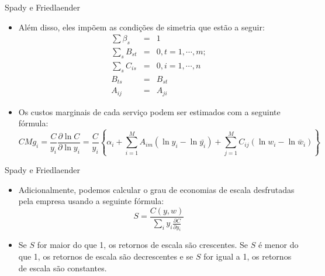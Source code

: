 \documentclass{beamer}
\begin{document}
\begin{frame}{Spady e Friedlaender}

\begin{itemize}
\item Além disso, eles impõem as condições de simetria que estão a seguir:
\begin{eqnarray*}
\sum\beta_{s} & = & 1\\
\sum_{s}B_{st} & = & 0,t=1,\cdots,m;\\
\sum_{s}C_{is} & = & 0,i=1,\cdots,n\\
B_{ts} & = & B_{st}\\
A_{ij} & = & A_{ji}
\end{eqnarray*}
\item Os custos marginais de cada serviço podem ser estimados com a seguinte
fórmula:{\scriptsize{}
\[
CMg_{i}=\frac{C}{y_{i}}\frac{\partial\ln C}{\partial\ln y_{i}}=\frac{C}{y_{i}}\left\{ \alpha_{i}+\sum_{i=1}^{M}A_{im}(\ln y_{i}-\ln\bar{y_{i}})+\sum_{j=1}^{M}C_{ij}(\ln w_{i}-\ln\bar{w}_{i})\right\} 
\]
}{\scriptsize \par}
\end{itemize}
\end{frame}

\begin{frame}{Spady e Friedlaender}

\begin{itemize}
\item Adicionalmente, podemos calcular o grau de economias de escala desfrutadas
pela empresa usando a seguinte fórmula:
\[
S=\frac{C(y,w)}{\sum_{i}y_{i}\frac{\partial C}{\partial y_{i}}}
\]
\item Se $S$ for maior do que 1, os retornos de escala são crescentes.
Se $S$ é menor do que 1, os retornos de escala são decrescentes e
se $S$ for igual a 1, os retornos de escala são constantes. 
\end{itemize}
\end{frame}
\end{document}
